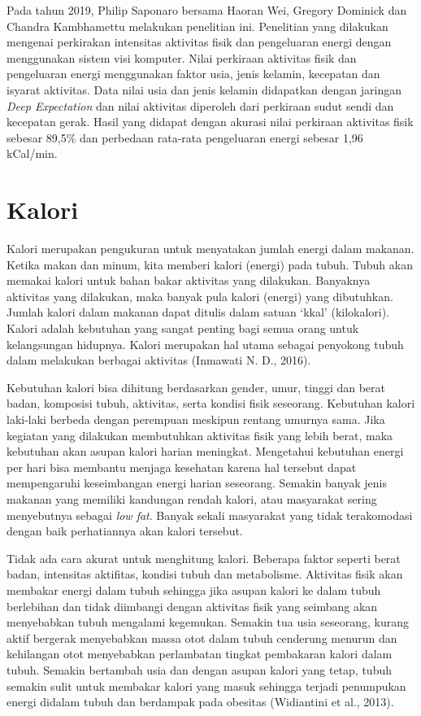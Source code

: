Pada tahun 2019, Philip Saponaro bersama Haoran Wei, Gregory Dominick dan Chandra Kambhamettu melakukan penelitian ini. Penelitian yang dilakukan mengenai perkirakan intensitas aktivitas fisik dan pengeluaran energi dengan menggunakan sistem visi komputer. Nilai perkiraan aktivitas fisik dan pengeluaran energi menggunakan faktor usia, jenis kelamin, kecepatan dan isyarat aktivitas. Data nilai usia dan jenis kelamin didapatkan dengan jaringan \emph{Deep Expectation} dan nilai aktivitas diperoleh dari perkiraan sudut sendi dan kecepatan gerak. Hasil yang didapat dengan akurasi nilai perkiraan aktivitas fisik sebesar 89,5\% dan perbedaan rata-rata pengeluaran energi sebesar 1,96 kCal/min.


\section{Kalori}
\label{sec:kalori}

Kalori merupakan pengukuran untuk menyatakan jumlah energi dalam makanan. Ketika makan dan minum, kita memberi kalori (energi) pada tubuh. Tubuh akan memakai kalori untuk bahan bakar aktivitas yang dilakukan. Banyaknya aktivitas yang dilakukan, maka banyak pula kalori (energi) yang dibutuhkan. Jumlah kalori dalam makanan dapat ditulis dalam satuan ‘kkal’ (kilokalori). Kalori adalah kebutuhan yang sangat penting bagi semua orang untuk kelangsungan hidupnya. Kalori merupakan hal utama sebagai penyokong tubuh dalam melakukan berbagai aktivitas (Inmawati N. D., 2016). 

Kebutuhan kalori bisa dihitung berdasarkan gender, umur, tinggi dan berat badan, komposisi tubuh, aktivitas, serta kondisi fisik seseorang. Kebutuhan kalori laki-laki berbeda dengan perempuan meskipun rentang umurnya sama. Jika kegiatan yang dilakukan membutuhkan aktivitas fisik yang lebih berat, maka kebutuhan akan asupan kalori harian meningkat. Mengetahui kebutuhan energi per hari bisa membantu menjaga kesehatan karena hal tersebut dapat mempengaruhi keseimbangan energi harian seseorang. Semakin banyak jenis makanan yang memiliki kandungan rendah kalori, atau masyarakat sering menyebutnya sebagai \emph{low fat}. Banyak sekali masyarakat yang tidak terakomodasi dengan baik perhatiannya akan kalori tersebut.

Tidak ada cara akurat untuk menghitung kalori. Beberapa faktor seperti berat badan, intensitas aktifitas, kondisi tubuh dan metabolisme. Aktivitas fisik akan membakar energi dalam tubuh sehingga jika asupan kalori ke dalam tubuh berlebihan dan tidak diimbangi dengan aktivitas fisik yang seimbang akan menyebabkan tubuh mengalami kegemukan. Semakin tua usia seseorang, kurang aktif bergerak menyebabkan massa otot dalam tubuh cenderung menurun dan kehilangan otot menyebabkan perlambatan tingkat pembakaran kalori dalam tubuh. Semakin bertambah usia dan dengan asupan kalori yang tetap, tubuh semakin sulit untuk membakar kalori yang masuk sehingga terjadi penumpukan energi didalam tubuh dan berdampak pada obesitas (Widiantini et al., 2013).



